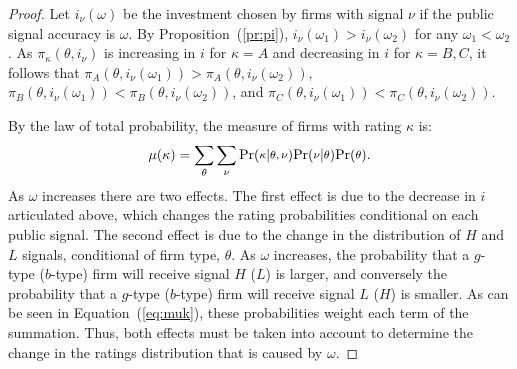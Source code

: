\documentclass[notitlepage]{article}
\begin{document}
\begin{proof}
Let $i_{\nu}(\omega)$ be the investment chosen by firms with signal $\nu$ if the public signal accuracy is $\omega$. By Proposition~(\ref{pr:pi}), $i_{\nu}(\omega_{1})>i_{\nu}(\omega_{2})$ for any $\omega_{1}<\omega_{2}$. As $\pi_{\kappa}(\theta,i_{\nu})$ is increasing in $i$ for $\kappa=A$ and decreasing in $i$ for $\kappa=B,C$, it follows that $\pi_{A}(\theta,i_{\nu}(\omega_{1}))>\pi_{A}(\theta,i_{\nu}(\omega_{2}))$, $\pi_{B}(\theta,i_{\nu}(\omega_{1}))<\pi_{B}(\theta,i_{\nu}(\omega_{2}))$, and $\pi_{C}(\theta,i_{\nu}(\omega_{1}))<\pi_{C}(\theta,i_{\nu}(\omega_{2}))$.

By the law of total probability, the measure of firms with rating $\kappa$ is:
\begin{equation}
\label{eq:muk}%
\mu(\kappa) = \sum_{\theta}\sum_{\nu}\textup{Pr}(\medmath{\kappa}|\medmath{\theta,\nu})\textup{Pr}(\medmath{\nu}|\medmath{\theta})\textup{Pr}(\medmath{\theta}).
\end{equation}
As $\omega$ increases there are two effects. The first effect is due to the decrease in $i$ articulated above, which changes the rating probabilities conditional on each public signal. The second effect is due to the change in the distribution of $H$ and $L$ signals, conditional of firm type, $\theta$. As $\omega$ increases, the probability that a $g$-type ($b$-type) firm will receive signal $H$ ($L$) is larger, and conversely the probability that a $g$-type ($b$-type) firm will receive signal $L$ ($H$) is smaller. As can be seen in Equation~(\ref{eq:muk}), these probabilities weight each term of the summation. Thus, both effects must be taken into account to determine the change in the ratings distribution that is caused by $\omega$.


\end{proof}
\end{document}
